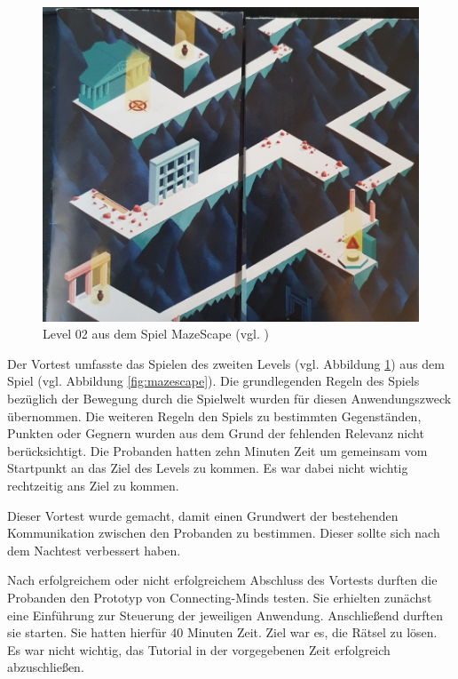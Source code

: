 \begin{figure}[ht]
\centering
\includegraphics[width=1\linewidth]{content/pictures/MazeScape_Level02.jpg}
\caption{Level 02 aus dem Spiel MazeScape (vgl. \cite{noauthor_mazescape_nodate})}
\label{fig:mazescape_level-02}
\end{figure}

Der Vortest umfasste das Spielen des zweiten Levels (vgl. Abbildung \ref{fig:mazescape_level-02}) aus dem Spiel  (vgl. Abbildung \ref{fig:mazescape}). Die grundlegenden Regeln des Spiels bezüglich der Bewegung durch die Spielwelt wurden für diesen Anwendungszweck übernommen. Die weiteren Regeln den Spiels zu bestimmten Gegenständen, Punkten oder Gegnern wurden aus dem Grund der fehlenden Relevanz nicht berücksichtigt. Die Probanden hatten zehn Minuten Zeit um gemeinsam vom Startpunkt an das Ziel des Levels zu kommen. Es war dabei nicht wichtig rechtzeitig ans Ziel zu kommen.

Dieser Vortest wurde gemacht, damit einen Grundwert der bestehenden Kommunikation zwischen den Probanden zu bestimmen. Dieser sollte sich nach dem Nachtest verbessert haben.

Nach erfolgreichem  oder nicht erfolgreichem Abschluss des Vortests durften die Probanden den Prototyp von Connecting-Minds testen. Sie erhielten zunächst eine Einführung zur Steuerung der jeweiligen Anwendung. Anschließend durften sie starten. Sie hatten hierfür 40 Minuten Zeit. Ziel war es, die Rätsel zu lösen. Es war nicht wichtig, das Tutorial in der vorgegebenen Zeit erfolgreich  abzuschließen.

